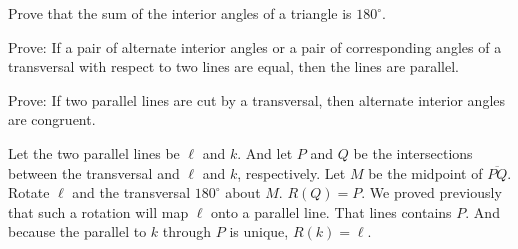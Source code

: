 \documentclass[nooutcomes]{ximera}
\begin{document}
\begin{question}
Prove that the sum of the interior angles of a triangle is $180^\circ$.
\end{question}

\begin{question}
Prove: If a pair of alternate interior angles or a pair of corresponding angles of a transversal with respect to two lines are equal, then the lines are parallel.
\begin{freeResponse}
\begin{hint}
\end{hint}
\end{freeResponse}
\end{question}

\begin{question}
Prove: If two parallel lines are cut by a transversal, then alternate interior angles are congruent.  
\begin{freeResponse}
\begin{hint}
Let the two parallel lines be $\ell$ and $k$.  And let $P$ and $Q$ be the intersections between the transversal and $\ell$ and $k$, respectively.  Let $M$ be the midpoint of $\overline{PQ}$.  Rotate $\ell$ and the transversal $180^\circ$ about $M$.  $R(Q)=P$.  We proved previously that such a rotation will map $\ell$ onto a parallel line.  That lines contains $P$.  And because the parallel to $k$ through $P$ is unique, $R(k)=\ell$.  %
\end{hint}
\end{freeResponse}
\end{question}
\end{document}
